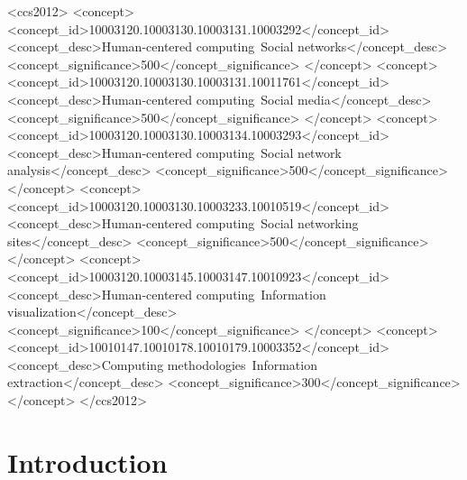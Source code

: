 \documentclass[sigconf]{acmart}
\begin{document}
\begin{CCSXML}
<ccs2012>
<concept>
<concept_id>10003120.10003130.10003131.10003292</concept_id>
<concept_desc>Human-centered computing~Social networks</concept_desc>
<concept_significance>500</concept_significance>
</concept>
<concept>
<concept_id>10003120.10003130.10003131.10011761</concept_id>
<concept_desc>Human-centered computing~Social media</concept_desc>
<concept_significance>500</concept_significance>
</concept>
<concept>
<concept_id>10003120.10003130.10003134.10003293</concept_id>
<concept_desc>Human-centered computing~Social network analysis</concept_desc>
<concept_significance>500</concept_significance>
</concept>
<concept>
<concept_id>10003120.10003130.10003233.10010519</concept_id>
<concept_desc>Human-centered computing~Social networking sites</concept_desc>
<concept_significance>500</concept_significance>
</concept>
<concept>
<concept_id>10003120.10003145.10003147.10010923</concept_id>
<concept_desc>Human-centered computing~Information visualization</concept_desc>
<concept_significance>100</concept_significance>
</concept>
<concept>
<concept_id>10010147.10010178.10010179.10003352</concept_id>
<concept_desc>Computing methodologies~Information extraction</concept_desc>
<concept_significance>300</concept_significance>
</concept>
</ccs2012>
\end{CCSXML}



\maketitle

\section{Introduction}\label{intro}
\end{document}
